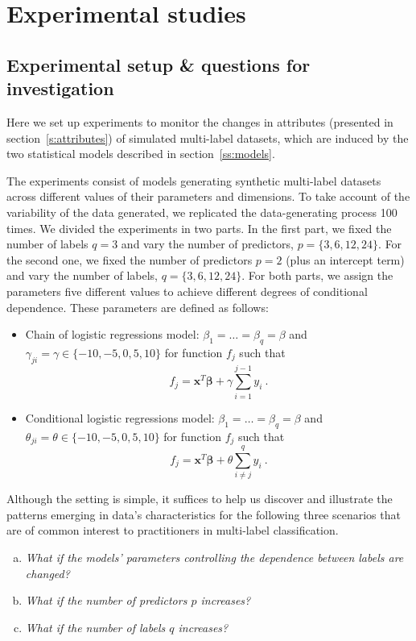 \documentclass[review]{elsarticle}
\begin{document}
	
	\section{Experimental studies}
	
	\subsection{Experimental setup \& questions for investigation}
	\label{DEXPER} 
	
	Here we set up experiments to monitor the changes in attributes (presented in section~\ref{s:attributes}) of simulated multi-label datasets, which are induced by the two statistical models described in section~\ref{ss:models}.
	
	The experiments consist of models generating synthetic multi-label datasets across different values of their parameters and dimensions. To take account of the variability of the data generated, we replicated the data-generating process 100 times. We divided the experiments in two parts. In the first part, we fixed the number of labels $q=3$ and vary the number of predictors, $p = \{ 3, 6, 12, 24\}$. For the second one, we fixed the number of predictors $p = 2$ (plus an intercept term) and vary the number of labels, $q = \{ 3, 6,12, 24\}$. For both parts, we assign the parameters five different values to achieve different degrees of conditional dependence. These parameters are defined as follows:
	\begin{itemize}
		\item Chain of logistic regressions model: $\beta_{1} = \ldots = \beta_{q} = \beta$ and $\gamma_{{j}i} = \gamma \in \{ -10, -5, 0, 5, 10 \}$ for function $f_{j}$ such that
		\begin{equation}\label{eq:param:gamma}
		f_{j} = \mathbf{x}^T\bm{\beta} + \gamma \sum_{i=1}^{j-1} y_{i}\ .
		\end{equation}
		\item Conditional logistic regressions model: $\beta_{1} = \ldots = \beta_{q} = \beta$ and $\theta_{ji} = \theta \in \{ -10, -5, 0, 5, 10\}$ for function $f_{j}$ such that
		\begin{equation}\label{eq:param:theta}
		f_{j} = \mathbf{x}^T \bm{\beta} + \theta \sum^{q}_{i \neq j}{y_{i}}\ .
		\end{equation}
	\end{itemize}
	
	Although the setting is simple, it suffices to help us discover and illustrate the patterns emerging in data's characteristics for the following three scenarios that are of common interest to practitioners in multi-label classification.
	\begin{enumerate}[(a)]
		\item \emph{What if the models' parameters controlling the dependence between labels are changed?} 
		\item  \emph{What if the number of predictors $p$ increases?} 
		\item \emph{What if the number of labels $q$ increases?} 
	\end{enumerate}
	
\end{document}
